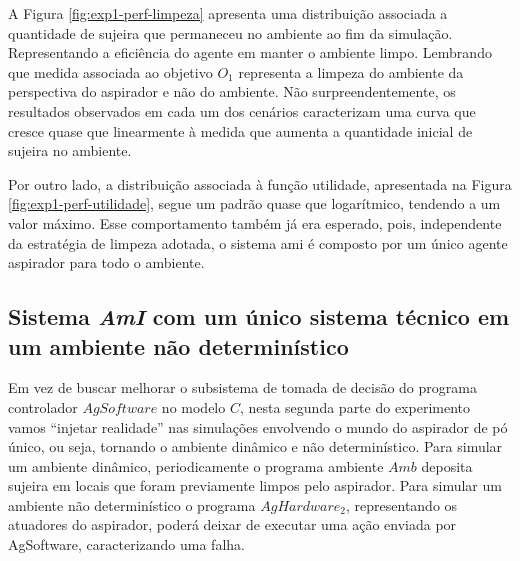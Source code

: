 A Figura \ref{fig:exp1-perf-limpeza} apresenta uma distribuição associada a quantidade de sujeira que permaneceu no ambiente ao fim da simulação. Representando a eficiência do agente em manter o ambiente limpo. Lembrando que medida associada ao objetivo $O_1$ representa a limpeza do ambiente da perspectiva do aspirador e não do ambiente. Não surpreendentemente, os resultados observados em cada um dos cenários caracterizam uma curva que cresce quase que linearmente à medida que aumenta a quantidade inicial de sujeira no ambiente.

\begin{figure}[h!]
    \centering
\end{figure}

Por outro lado, a distribuição associada à função utilidade, apresentada na Figura \ref{fig:exp1-perf-utilidade}, segue um padrão quase que logarítmico, tendendo a um valor máximo. Esse comportamento também já era esperado, pois, independente da estratégia de limpeza adotada, o sistema \acrshort{ami} é composto por um único agente aspirador para todo o ambiente. 


\subsection{Sistema \textit{AmI} com um único sistema técnico em um ambiente não determinístico}
\label{sec:exp-dinamico}
Em vez de buscar melhorar o subsistema de tomada de decisão do programa controlador $AgSoftware$ no modelo $C$, nesta segunda parte do experimento vamos “injetar realidade” nas simulações envolvendo o mundo do aspirador de pó único, ou seja, tornando o ambiente dinâmico e não determinístico. Para simular um ambiente dinâmico, periodicamente o programa ambiente $Amb$ deposita sujeira em locais que foram previamente limpos pelo aspirador. Para simular um ambiente não determinístico o programa $AgHardware_2$, representando os atuadores do aspirador, poderá deixar de executar uma ação enviada por AgSoftware, caracterizando uma falha.


